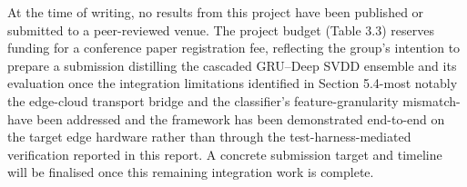 At the time of writing, no results from this project have been published or submitted to a peer-reviewed venue. The project budget (Table 3.3) reserves funding for a conference paper registration fee, reflecting the group's intention to prepare a submission distilling the cascaded GRU--Deep SVDD ensemble and its evaluation once the integration limitations identified in Section 5.4-most notably the edge-cloud transport bridge and the classifier's feature-granularity mismatch-have been addressed and the framework has been demonstrated end-to-end on the target edge hardware rather than through the test-harness-mediated verification reported in this report. A concrete submission target and timeline will be finalised once this remaining integration work is complete.